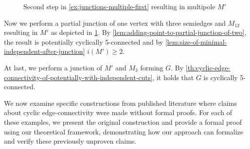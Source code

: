 \documentclass[12pt, twoside]{book}
\begin{document}
\begin{example}
\begin{figure}
		\caption{Second step in \cref{ex:junctions-multiple-first} resulting in multipole $M'$}
		\label{fig:3-5-poles-connected-step-2}
	\end{figure}
	
	Now we perform a partial junction of one vertex with three semiedges and $M_{12}$ resulting in $M'$ as depicted in \cref{fig:3-5-poles-connected-step-2}. By \cref{lem:adding-point-to-partial-junction-of-two}, the result is potentially cyclically 5-connected and by \cref{lem:size-of-minimal-independent-after-junction} $i(M')\geq 2$.
	
	At last, we perform a junction of $M'$ and $M_3$ forming $G$. By \cref{th:cyclic-edge-connectivity-of-potentially-with-independent-cuts}, it holds that $G$ is cyclically 5-connected.
\end{example}

We now examine specific constructions from published literature where claims about cyclic edge-connectivity were made without formal proofs. For each of these examples, we present the original construction and provide a formal proof using our theoretical framework, demonstrating how our approach can formalize and verify these previously unproven claims.
\end{document}
